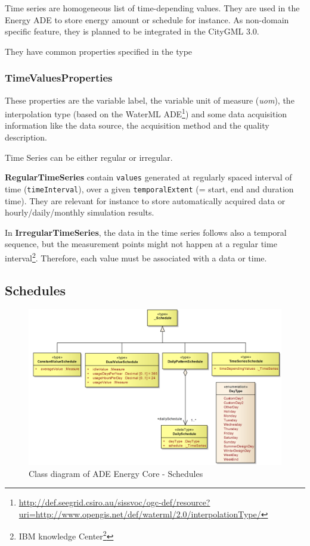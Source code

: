 \documentclass[a4paper,12pt]{article}
\renewcommand{\href}[2]{#2\footnote{\url{#1}}}
\begin{document}
Time series are homogeneous list of time-depending values. They are used
in the Energy ADE to store energy amount or schedule for instance. As
non-domain specific feature, they is planned to be integrated in the
CityGML 3.0.

They have common properties specified in the type

\subsubsection{TimeValuesProperties}\label{timevaluesproperties}

These properties are the variable label, the variable unit of measure
(\emph{uom}), the interpolation type (based on the
\href{http://def.seegrid.csiro.au/sissvoc/ogc-def/resource?uri=http://www.opengis.net/def/waterml/2.0/interpolationType/}{WaterML
ADE}) and some data acquisition information like the data source, the
acquisition method and the quality description.

Time Series can be either regular or irregular.

\textbf{RegularTimeSeries} contain \texttt{values} generated at
regularly spaced interval of time (\texttt{timeInterval}), over a given
\texttt{temporalExtent} (= start, end and duration time). They are
relevant for instance to store automatically acquired data or
hourly/daily/monthly simulation results.

In \textbf{IrregularTimeSeries}, the data in the time series follows
also a temporal sequence, but the measurement points might not happen at
a regular time interval\footnote{\href{http://www-01.ibm.com/support/knowledgecenter/SSCRJU_3.0.0/com.ibm.swg.im.infosphere.streams.timeseries-toolkit.doc/doc/timeseries-regular.html}{IBM
  knowledge Center}}. Therefore, each value must be associated with a
data or time.

\subsection{Schedules}\label{schedules}

\begin{figure}[htbp]
\centering
\includegraphics{fig/class_schedules.png}
\caption{Class diagram of ADE Energy Core - Schedules}
\end{figure}
\end{document}
